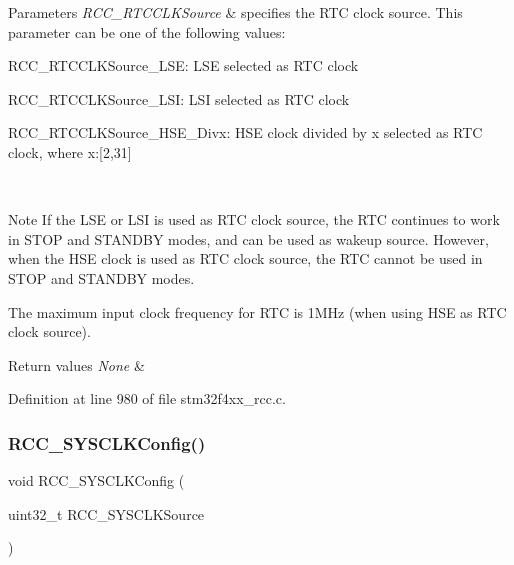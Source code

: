 \begin{DoxyParams}{Parameters}
{\em R\+C\+C\+\_\+\+R\+T\+C\+C\+L\+K\+Source} & specifies the R\+TC clock source. This parameter can be one of the following values\+: \begin{DoxyItemize}
\item R\+C\+C\+\_\+\+R\+T\+C\+C\+L\+K\+Source\+\_\+\+L\+SE\+: L\+SE selected as R\+TC clock \item R\+C\+C\+\_\+\+R\+T\+C\+C\+L\+K\+Source\+\_\+\+L\+SI\+: L\+SI selected as R\+TC clock \item R\+C\+C\+\_\+\+R\+T\+C\+C\+L\+K\+Source\+\_\+\+H\+S\+E\+\_\+\+Divx\+: H\+SE clock divided by x selected as R\+TC clock, where x\+:\mbox{[}2,31\mbox{]}\end{DoxyItemize}
\\
\hline
\end{DoxyParams}
\begin{DoxyNote}{Note}
If the L\+SE or L\+SI is used as R\+TC clock source, the R\+TC continues to work in S\+T\+OP and S\+T\+A\+N\+D\+BY modes, and can be used as wakeup source. However, when the H\+SE clock is used as R\+TC clock source, the R\+TC cannot be used in S\+T\+OP and S\+T\+A\+N\+D\+BY modes. 

The maximum input clock frequency for R\+TC is 1\+M\+Hz (when using H\+SE as R\+TC clock source).
\end{DoxyNote}

\begin{DoxyRetVals}{Return values}
{\em None} & \\
\hline
\end{DoxyRetVals}


Definition at line 980 of file stm32f4xx\+\_\+rcc.\+c.

\mbox{\label{group___r_c_c_ga3551a36a8f0a3dc96a74d6b939048337}} 
\subsubsection{\texorpdfstring{R\+C\+C\+\_\+\+S\+Y\+S\+C\+L\+K\+Config()}{RCC\_SYSCLKConfig()}}
{\footnotesize\ttfamily void R\+C\+C\+\_\+\+S\+Y\+S\+C\+L\+K\+Config (\begin{DoxyParamCaption}\item[{uint32\+\_\+t}]{R\+C\+C\+\_\+\+S\+Y\+S\+C\+L\+K\+Source }\end{DoxyParamCaption})}



